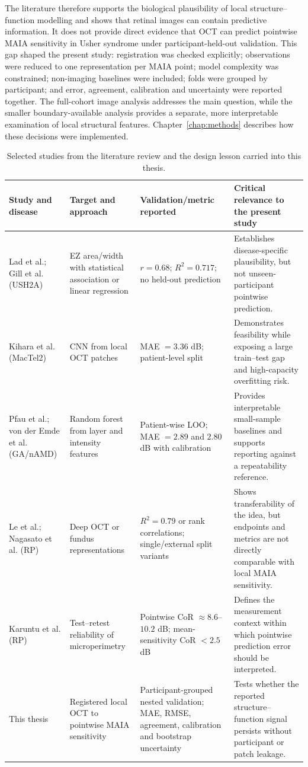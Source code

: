 The literature therefore supports the biological plausibility of local structure--function modelling and shows that retinal images can contain predictive information. It does not provide direct evidence that OCT can predict pointwise MAIA sensitivity in Usher syndrome under participant-held-out validation. This gap shaped the present study: registration was checked explicitly; observations were reduced to one representation per MAIA point; model complexity was constrained; non-imaging baselines were included; folds were grouped by participant; and error, agreement, calibration and uncertainty were reported together. The full-cohort image analysis addresses the main question, while the smaller boundary-available analysis provides a separate, more interpretable examination of local structural features. Chapter~\ref{chap:methods} describes how these decisions were implemented.

\begin{table}[htbp]
\centering
\caption{Selected studies from the literature review and the design lesson carried into this thesis.}
\label{tab:literature-metrics}
\begin{tabularx}{\textwidth}{@{}>{\raggedright\arraybackslash}p{}>{\raggedright\arraybackslash}p{}>{\raggedright\arraybackslash}p{}>{\raggedright\arraybackslash}X@{}}
\toprule
Study and disease & Target and approach & Validation/metric reported & Critical relevance to the present study \\
\midrule
Lad et al.; Gill et al. (USH2A) & EZ area/width with statistical association or linear regression & $r=0.68$; $R^2=0.717$; no held-out prediction & Establishes disease-specific plausibility, but not unseen-participant pointwise prediction. \\
Kihara et al. (MacTel2) & CNN from local OCT patches & MAE $=3.36$ dB; patient-level split & Demonstrates feasibility while exposing a large train--test gap and high-capacity overfitting risk. \\
Pfau et al.; von der Emde et al. (GA/nAMD) & Random forest from layer and intensity features & Patient-wise LOO; MAE $=2.89$ and $2.80$ dB with calibration & Provides interpretable small-sample baselines and supports reporting against a repeatability reference. \\
Le et al.; Nagasato et al. (RP) & Deep OCT or fundus representations & $R^2=0.79$ or rank correlations; single/external split variants & Shows transferability of the idea, but endpoints and metrics are not directly comparable with local MAIA sensitivity. \\
Karuntu et al. (RP) & Test--retest reliability of microperimetry & Pointwise CoR $\approx8.6$--$10.2$ dB; mean-sensitivity CoR $<2.5$ dB & Defines the measurement context within which pointwise prediction error should be interpreted. \\
This thesis & Registered local OCT to pointwise MAIA sensitivity & Participant-grouped nested validation; MAE, RMSE, agreement, calibration and bootstrap uncertainty & Tests whether the reported structure--function signal persists without participant or patch leakage. \\
\bottomrule
\end{tabularx}
\end{table}
